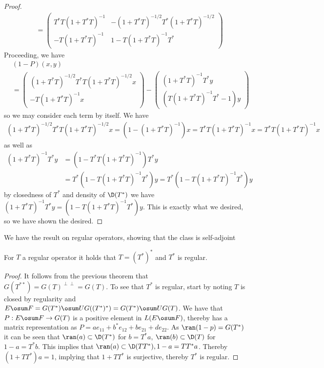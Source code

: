 \begin{proof}
\begin{align*}
		&=\begin{pmatrix} T^*T(1+T^*T)^{-1} & -(1+T^*T)^{-1/2}T^*(1+T^*T)^{-1/2} \\ -T(1+T^*T)^{-1} &  1-T(1+T^*T)^{-1}T^* \end{pmatrix}
	\end{align*}
	Proceeding, we have 
	\begin{align*}
		&(1-P)(x,y) \\
		&=\begin{pmatrix} (1+T^*T)^{-1/2}T^*T(1+T^*T)^{-1/2}x \\ -T(1+T^*T)^{-1}x \end{pmatrix} -\begin{pmatrix} (1+T^*T)^{-1}T^*y \\ (T(1+T^*T)^{-1}T^*-1)y \end{pmatrix}
	\end{align*}
	so we may consider each term by itself. We have 
	\begin{align*}
		(1+T^*T)^{-1/2}T^*T(1+T^*T)^{-1/2}x=(1-(1+T^*T)^{-1})x=T^*T(1+T^*T)^{-1}x=T^*T(1+T^*T)^{-1}x
	\end{align*}
	as well as 
	\begin{align*}
		(1+T^*T)^{-1}T^*y&=(1-T^*T(1+T^*T)^{-1})T^*y \\
		&=T^*(1-T(1+T^*T)^{-1}T^*)y=T^*(1-T(1+T^*T)^{-1}T^*)y
	\end{align*}
	by closedness of $T^*$ and density of $\D(T^*)$ we have $(1+T^*T)^{-1}T^*y=(1-T(1+T^*T)^{-1}T^*)y$. This is exactly what we desired, so we have shown the desired. 
\end{proof}
We have the result on regular operators, showing that the class is self-adjoint
\begin{lemma}\label{reflexregular}
	For $T$ a regular operator it holds that $T=(T^*)^*$ and $T^*$ is regular. 
\end{lemma}
\begin{proof}
	It follows from the previous theorem that $G(T^{**})=G(T)^{\perp \perp}=G(T)$. To see that $T^*$ is regular, start by noting $T$ is closed by regularity and $E\osum F=G(T^*)\osum UG((T^*)^*)=G(T^*)\osum UG(T)$.
	We have that $P:E\osum F\to G(T)$ is a positive element in $L(E\osum F)$, thereby has a matrix representation as $P=ae_11+b^*e_{12}+be_{21}+de_{22}$. As $\ran(1-p)=G(T^*)$ it can be seen that $\ran(a)\subset \D(T^*)$ for $b=T^*a$, $\ran(b)\subset \D(T)$ for $1-a=T^*b$. This implies that $\ran(a)\subset \D(TT^*),1-a=TT^*a$. Thereby $(1+TT^*)a=1$, implying that $1+TT^*$ is surjective, thereby $T^*$ is regular. 
\end{proof}
